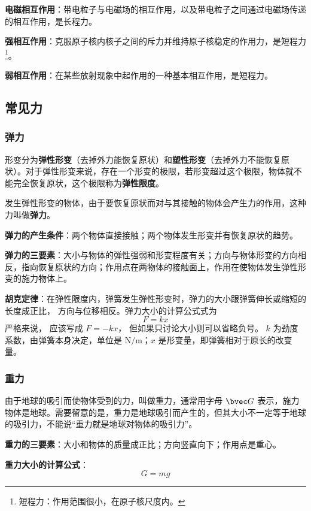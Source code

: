 \textbf{电磁相互作用}：带电粒子与电磁场的相互作用，以及带电粒子之间通过电磁场传递的相互作用，是长程力。

\textbf{强相互作用}：克服原子核内核子之间的斥力并维持原子核稳定的作用力，是短程力\footnote{短程力：作用范围很小，在原子核尺度内。}。

\textbf{弱相互作用}：在某些放射现象中起作用的一种基本相互作用，是短程力。

\subsection{常见力}

\subsubsection{弹力}
形变分为\textbf{弹性形变}（去掉外力能恢复原状）和\textbf{塑性形变}（去掉外力不能恢复原状）。对于弹性形变来说，存在一个形变的极限，若形变超过这个极限，物体就不能完全恢复原状，这个极限称为\textbf{弹性限度}。

发生弹性形变的物体，由于要恢复原状而对与其接触的物体会产生力的作用，这种力叫做\textbf{弹力}。

\textbf{弹力的产生条件}：两个物体直接接触；两个物体发生形变并有恢复原状的趋势。

\textbf{弹力的三要素}：大小与物体的弹性强弱和形变程度有关；方向与物体形变的方向相反，指向恢复原状的方向；作用点在两物体的接触面上，作用在使物体发生弹性形变的施力物体上。

\textbf{胡克定律}：在弹性限度内，弹簧发生弹性形变时，弹力的大小跟弹簧伸长或缩短的长度成正比， 方向与位移相反。弹力大小的计算公式式为
\begin{equation}
F=kx
\end{equation}
严格来说， 应该写成 $F=-kx$， 但如果只讨论大小则可以省略负号。 $k$ 为劲度系数，由弹簧本身决定，单位是 $\mathrm{N/m}$；$x$ 是形变量，即弹簧相对于原长的改变量。

\subsubsection{重力}
由于地球的吸引而使物体受到的力，叫做重力，通常用字母 $\bvec G$ 表示，施力物体是地球。需要留意的是，重力是地球吸引而产生的，但其大小不一定等于地球的吸引力，不能说“重力就是地球对物体的吸引力”。

\textbf{重力的三要素}：大小和物体的质量成正比；方向竖直向下；作用点是重心。

\textbf{重力大小的计算公式}：
\begin{equation}
G=mg
\end{equation}

